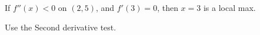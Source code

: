 \documentclass{ximera}
\author{Steven Gubkin\and Nela Lakos}
\begin{document}
\begin{exercise}

	If $f''(x)<0$ on $(2,5)$, and $f'(3)=0$, then $x=3$ is a local max.
		\begin{hint}
Use the Second derivative test.
\end{hint}	
	\begin{multipleChoice}
	\end{multipleChoice}

\end{exercise}
\end{document}
